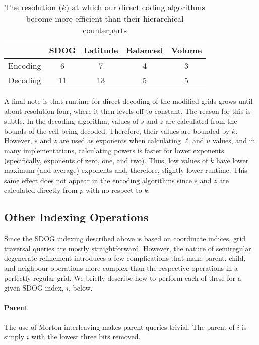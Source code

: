 \begin{table}[htp!]
	\centering
	\caption[Resolution at which direct coding becomes more efficient than hierarchical]{
		The resolution ($k$) at which our direct coding algorithms become more efficient than their hierarchical counterparts
	}
	\begin{tabular}{@{} c c c c c @{}}
		\toprule
		         & SDOG & Latitude & Balanced & Volume \\ \midrule
		Encoding & 6    & 7        & 4        & 3      \\
		Decoding & 11   & 13       & 5        & 5      \\ \bottomrule
	\end{tabular}
	\label{tab:hierarch-vs-direct}
\end{table}


A final note is that runtime for direct decoding of the modified grids grows until about resolution four, where it then levels off to constant.
The reason for this is subtle.
In the decoding algorithm, values of $s$ and $z$ are calculated from the bounds of the cell being decoded.
Therefore, their values are bounded by $k$.
However, $s$ and $z$ are used as exponents when calculating $\ell$ and $u$ values, and in many implementations, calculating powers is faster for lower exponents (specifically, exponents of zero, one, and two).
Thus, low values of $k$ have lower maximum (and average) exponents and, therefore, slightly lower runtime.
This same effect does not appear in the encoding algorithms since $s$ and $z$ are calculated directly from $p$ with no respect to $k$.


\subsection{Other Indexing Operations}
Since the SDOG indexing described above is based on coordinate indices, grid traversal queries are mostly straightforward.
However, the nature of semiregular degenerate refinement introduces a few complications that make parent, child, and neighbour operations more complex than the respective operations in a perfectly regular grid.
We briefly describe how to perform each of these for a given SDOG index, $i$, below.


\paragraph{Parent}
The use of Morton interleaving makes parent queries trivial. The parent of $i$ is simply $i$ with the lowest three bits removed.


